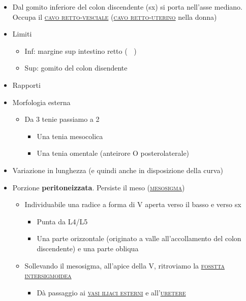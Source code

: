 \documentclass[italian,]{article}
\providecommand{\tightlist}{%
  \setlength{\itemsep}{0pt}\setlength{\parskip}{0pt}}
\newcommand{\oss}[1]{\colorbox{ossa}{\textcolor{white}{\textsc{#1}}}}
\renewcommand{\a}[1]{\underline{\textsc{#1}}}
\begin{document}
\begin{itemize}
\tightlist
\item
  Dal gomito inferiore del colon discendente (sx) si porta nell'asse
  mediano. Occupa il \a{cavo retto-vesciale} (\a{cavo retto-uterino}
  nella donna)
\item
  Limiti

  \begin{itemize}
  \tightlist
  \item
    Inf: margine sup intestino retto (\oss{s3})
  \item
    Sup: gomito del colon disendente
  \end{itemize}
\item
  Rapporti
\item
  Morfologia esterna

  \begin{itemize}
  \tightlist
  \item
    Da 3 tenie passiamo a 2

    \begin{itemize}
    \tightlist
    \item
      Una tenia mesocolica
    \item
      Una tenia omentale (anteirore O posterolaterale)
    \end{itemize}
  \end{itemize}
\item
  Variazione in lunghezza (e quindi anche in disposizione della curva)
\item
  Porzione \textbf{peritoneizzata}. Persiste il meso (\a{mesosigma})

  \begin{itemize}
  \tightlist
  \item
    Individuabile una radice a forma di V aperta verso il basso e verso
    sx

    \begin{itemize}
    \tightlist
    \item
      Punta da L4/L5
    \item
      Una parte orizzontale (originato a valle all'accollamento del
      colon discendente) e una parte obliqua
    \end{itemize}
  \item
    Sollevando il mesosigma, all'apice della V, ritroviamo la
    \a{fosstta intersigmoidea}

    \begin{itemize}
    \tightlist
    \item
      Dà passaggio ai \a{vasi iliaci esterni} e all'\a{uretere}
    \end{itemize}
  \end{itemize}
\end{itemize}
\end{document}
